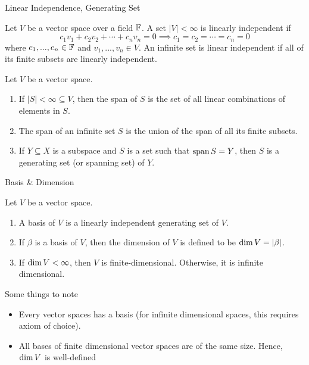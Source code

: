 \documentclass[10pt]{beamer}
\begin{document}
    \begin{frame}{Linear Independence, Generating Set}
        \begin{definition}
            Let $V$ be a vector space over a field $\mathbb{F}$. A set $|V| < \infty$ is \alert{linearly independent} if 
            \begin{equation*}
                c_1v_1 + c_2v_2 + \cdots + c_nv_n = 0 \implies c_1 = c_2 = \cdots = c_n = 0
            \end{equation*}
            where $c_1, ..., c_n\in\mathbb{F}$ and $v_1, ..., v_n\in V$. An infinite set is linear independent if all of its finite subsets are linearly independent.
        \end{definition}

        \begin{definition}
            Let $V$ be a vector space. 
            \begin{enumerate}
                \item If $|S| < \infty \subseteq V$, then the \alert{span} of $S$ is the set of all linear combinations of elements in $S$. 
                \item The span of an infinite set $S$ is the union of the span of all its finite subsets. 
                \item If $Y \subseteq X$ is a subspace and $S$ is a set such that $\operatorname{span} S = Y$, then $S$ is a \alert{generating set} (or \alert{spanning set}) of $Y$. 
            \end{enumerate}
        \end{definition}
    \end{frame}

    \begin{frame}{Basis \& Dimension}
        \begin{definition}
            Let $V$ be a vector space. 
            \begin{enumerate}
                \item A \alert{basis} of $V$ is a linearly independent generating set of $V$. 
                \item If $\beta$ is a basis of $V$, then the \alert{dimension} of $V$ is defined to be $\operatorname{dim} V = |\beta|$. 
                \item If $\operatorname{dim} V < \infty$, then $V$ is \alert{finite-dimensional}. Otherwise, it is \alert{infinite dimensional}.
            \end{enumerate}
        \end{definition}
        Some things to note 
        \begin{itemize}
            \item<2-> Every vector spaces has a basis (for infinite dimensional spaces, this requires axiom of choice). 
            \item<3-> All bases of finite dimensional vector spaces are of the same size. Hence, $\operatorname{dim} V$ is well-defined
        \end{itemize}
    \end{frame}
\end{document}
